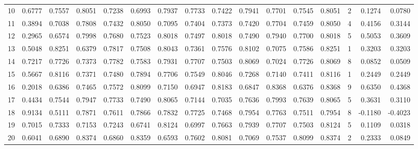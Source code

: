 \begin{tabular}{lrrrrrrrrrrrrrrr}
10  &      0.6777 &  0.7557 &  0.8051 &  0.7238 &  0.6993 &  0.7937 &  0.7733 &  0.7422 &  0.7941 &  0.7701 &   0.7545 &     0.8051 &      2 &                    0.1274 &                     0.0780 \\
11  &      0.3894 &  0.7038 &  0.7808 &  0.7432 &  0.8050 &  0.7095 &  0.7404 &  0.7373 &  0.7420 &  0.7704 &   0.7459 &     0.8050 &      4 &                    0.4156 &                     0.3144 \\
12  &      0.2965 &  0.6574 &  0.7998 &  0.7680 &  0.7523 &  0.8018 &  0.7497 &  0.8018 &  0.7490 &  0.7940 &   0.7700 &     0.8018 &      5 &                    0.5053 &                     0.3609 \\
13  &      0.5048 &  0.8251 &  0.6379 &  0.7817 &  0.7508 &  0.8043 &  0.7361 &  0.7576 &  0.8102 &  0.7075 &   0.7586 &     0.8251 &      1 &                    0.3203 &                     0.3203 \\
14  &      0.7217 &  0.7726 &  0.7373 &  0.7782 &  0.7583 &  0.7931 &  0.7707 &  0.7503 &  0.8069 &  0.7024 &   0.7726 &     0.8069 &      8 &                    0.0852 &                     0.0509 \\
15  &      0.5667 &  0.8116 &  0.7371 &  0.7480 &  0.7894 &  0.7706 &  0.7549 &  0.8046 &  0.7268 &  0.7140 &   0.7411 &     0.8116 &      1 &                    0.2449 &                     0.2449 \\
16  &      0.2018 &  0.6386 &  0.7465 &  0.7572 &  0.8099 &  0.7150 &  0.6947 &  0.8183 &  0.6847 &  0.8368 &   0.6376 &     0.8368 &      9 &                    0.6350 &                     0.4368 \\
17  &      0.4434 &  0.7544 &  0.7947 &  0.7733 &  0.7490 &  0.8065 &  0.7144 &  0.7035 &  0.7636 &  0.7993 &   0.7639 &     0.8065 &      5 &                    0.3631 &                     0.3110 \\
18  &      0.9134 &  0.5111 &  0.7871 &  0.7611 &  0.7866 &  0.7832 &  0.7725 &  0.7468 &  0.7954 &  0.7763 &   0.7511 &     0.7954 &      8 &                   -0.1180 &                    -0.4023 \\
19  &      0.7015 &  0.7333 &  0.7153 &  0.7243 &  0.6741 &  0.8124 &  0.6997 &  0.7663 &  0.7939 &  0.7707 &   0.7503 &     0.8124 &      5 &                    0.1109 &                     0.0318 \\
20  &      0.6041 &  0.6890 &  0.8374 &  0.6860 &  0.8359 &  0.6593 &  0.7602 &  0.8081 &  0.7069 &  0.7537 &   0.8099 &     0.8374 &      2 &                    0.2333 &                     0.0849 \\

\end{tabular}
